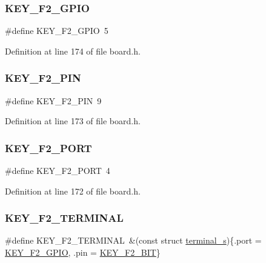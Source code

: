 \subsubsection{\texorpdfstring{K\+E\+Y\+\_\+\+F2\+\_\+\+G\+P\+IO}{KEY\_F2\_GPIO}}
{\footnotesize\ttfamily \#define K\+E\+Y\+\_\+\+F2\+\_\+\+G\+P\+IO~5}



Definition at line 174 of file board.\+h.

\mbox{\label{group__hal_ga7016f3ff674089b3e9377b58fd5791a2}} 
\subsubsection{\texorpdfstring{K\+E\+Y\+\_\+\+F2\+\_\+\+P\+IN}{KEY\_F2\_PIN}}
{\footnotesize\ttfamily \#define K\+E\+Y\+\_\+\+F2\+\_\+\+P\+IN~9}



Definition at line 173 of file board.\+h.

\mbox{\label{group__hal_gaed0ee447835028acfe743784357d77e8}} 
\subsubsection{\texorpdfstring{K\+E\+Y\+\_\+\+F2\+\_\+\+P\+O\+RT}{KEY\_F2\_PORT}}
{\footnotesize\ttfamily \#define K\+E\+Y\+\_\+\+F2\+\_\+\+P\+O\+RT~4}



Definition at line 172 of file board.\+h.

\mbox{\label{group__hal_ga7ff86388200bb3989273fc3b0dc138b2}} 
\subsubsection{\texorpdfstring{K\+E\+Y\+\_\+\+F2\+\_\+\+T\+E\+R\+M\+I\+N\+AL}{KEY\_F2\_TERMINAL}}
{\footnotesize\ttfamily \#define K\+E\+Y\+\_\+\+F2\+\_\+\+T\+E\+R\+M\+I\+N\+AL~\&(const struct \hyperlink{structterminal__s}{terminal\+\_\+s})\{.port = \hyperlink{group__hal_ga84995a20a536edfbc062b220c761768e}{K\+E\+Y\+\_\+\+F2\+\_\+\+G\+P\+IO}, .pin = \hyperlink{group__hal_gaa1529bc5c7a8cc9c0221078f2425eed8}{K\+E\+Y\+\_\+\+F2\+\_\+\+B\+IT}\}}



